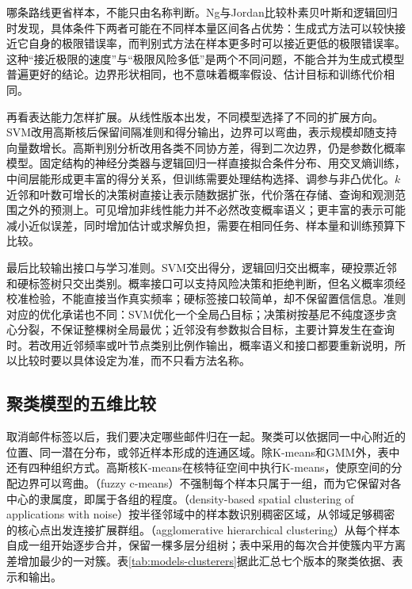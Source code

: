 哪条路线更省样本，不能只由名称判断。Ng与Jordan比较朴素贝叶斯和逻辑回归时发现，具体条件下两者可能在不同样本量区间各占优势：生成式方法可以较快接近它自身的极限错误率，而判别式方法在样本更多时可以接近更低的极限错误率。这种“接近极限的速度”与“极限风险多低”是两个不同问题，不能合并为生成式模型普遍更好的结论。边界形状相同，也不意味着概率假设、估计目标和训练代价相同。

再看表达能力怎样扩展。从线性版本出发，不同模型选择了不同的扩展方向。SVM改用高斯核后保留间隔准则和得分输出，边界可以弯曲，表示规模却随支持向量数增长。高斯判别分析改用各类不同协方差，得到二次边界，仍是参数化概率模型。固定结构的神经分类器与逻辑回归一样直接拟合条件分布、用交叉熵训练，中间层能形成更丰富的得分关系，但训练需要处理结构选择、调参与非凸优化。$k$近邻和叶数可增长的决策树直接让表示随数据扩张，代价落在存储、查询和观测范围之外的预测上。可见增加非线性能力并不必然改变概率语义；更丰富的表示可能减小近似误差，同时增加估计或求解负担，需要在相同任务、样本量和训练预算下比较。

最后比较输出接口与学习准则。SVM交出得分，逻辑回归交出概率，硬投票近邻和硬标签树只交出类别。概率接口可以支持风险决策和拒绝判断，但名义概率须经校准检验，不能直接当作真实频率；硬标签接口较简单，却不保留置信信息。准则对应的优化承诺也不同：SVM优化一个全局凸目标；决策树按基尼不纯度逐步贪心分裂，不保证整棵树全局最优；近邻没有参数拟合目标，主要计算发生在查询时。若改用近邻频率或叶节点类别比例作输出，概率语义和接口都要重新说明，所以比较时要以具体设定为准，而不只看方法名称。

\subsection{聚类模型的五维比较}
\label{sec:models-clustering-grid}

取消邮件标签以后，我们要决定哪些邮件归在一起。聚类可以依据同一中心附近的位置、同一潜在分布，或邻近样本形成的连通区域。除K-means和GMM外，表中还有四种组织方式。高斯核K-means在核特征空间中执行K-means，使原空间的分配边界可以弯曲。（fuzzy c-means）不强制每个样本只属于一组，而为它保留对各中心的隶属度，即属于各组的程度。（density-based spatial clustering of applications with noise）按半径邻域中的样本数识别稠密区域，从邻域足够稠密的核心点出发连接扩展群组。（agglomerative hierarchical clustering）从每个样本自成一组开始逐步合并，保留一棵多层分组树；表中采用的每次合并使簇内平方离差增加最少的一对簇。表\ref{tab:models-clusterers}据此汇总七个版本的聚类依据、表示和输出。

